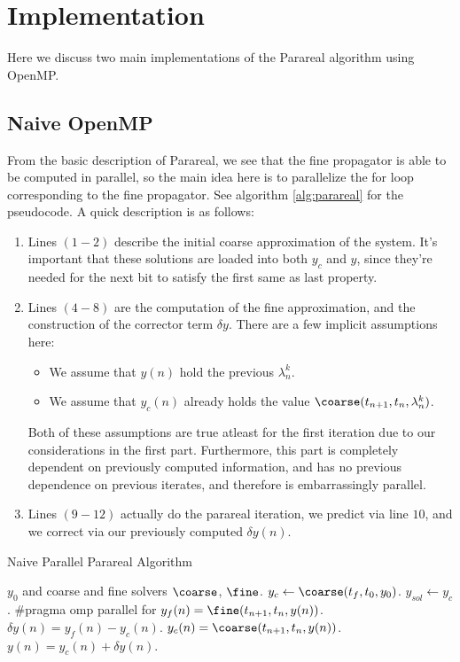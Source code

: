 \section{Implementation}

Here we discuss two main implementations of the Parareal algorithm using OpenMP.

\subsection{Naive OpenMP}

From the basic description of Parareal, we see that the fine propagator is able
to be computed in parallel, so the main idea here is to parallelize the for loop
corresponding to the fine propagator. See algorithm \ref{alg:parareal} for the
pseudocode. A quick description is as follows:
\begin{enumerate}[(1)]
  \item Lines $(1-2)$ describe the initial coarse approximation of the system.
    It's important that these solutions are loaded into both $y_c$ and $y$,
    since they're needed for the next bit to satisfy the first same as last
    property.
  \item Lines $(4-8)$ are the computation of the fine approximation, and the
    construction of the corrector term $\delta y$. There are a few implicit
    assumptions here:
    \begin{itemize}
      \item We assume that $y(n)$ hold the previous $\lambda_n^k$.
      \item We assume that $y_c(n)$ already holds the value $\coarse(t_{n+1},
        t_n, \lambda_n^k)$.
    \end{itemize}
    Both of these assumptions are true atleast for the first iteration due to
    our considerations in the first part. Furthermore, this part is completely
    dependent on previously computed information, and has no previous dependence
    on previous iterates, and therefore is embarrassingly parallel.
  \item Lines $(9-12)$ actually do the parareal iteration, we predict via line
    $10$, and we correct via our previously computed $\delta y(n)$.
\end{enumerate}
\begin{breakablealgorithm}
  \caption{Naive Parallel Parareal Algorithm}
  \label{alg:parareal}
  \begin{algorithmic}[1]
    \Require $y_0$ and coarse and fine solvers $\coarse$, $\fine$.
    \State $y_c \gets \coarse(t_f, t_0, y_0)$.
    \State $y_{sol} \gets y_c$.
      \State \#pragma omp parallel for
        \State $y_f(n) = \fine(t_{n+1},t_n,y(n))$.
        \State $\delta y(n) = y_f(n) - y_c(n)$.
      \EndFor
        \State $y_c(n) = \coarse(t_{n+1},t_n,y(n))$.
        \State $y(n) = y_c(n) + \delta y(n)$.
      \EndFor
    \EndWhile
  \end{algorithmic}
\end{breakablealgorithm}

